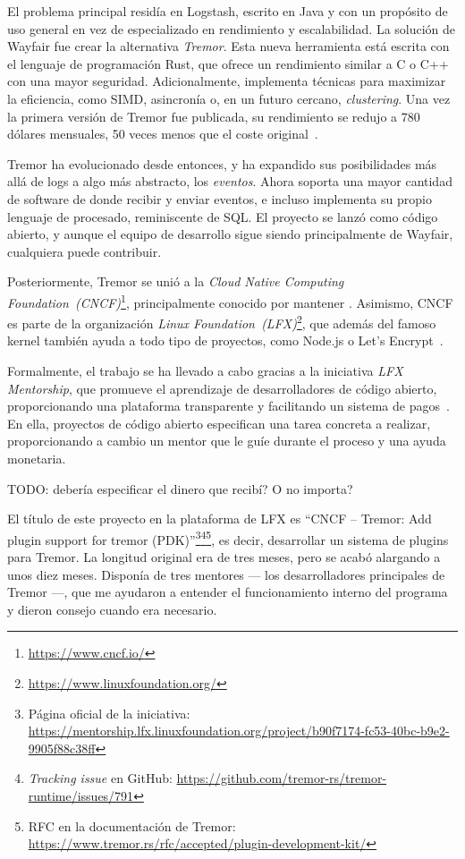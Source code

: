 El problema principal residía en Logstash, escrito en Java y con un propósito de
uso general en vez de especializado en rendimiento y escalabilidad. La solución
de Wayfair fue crear la alternativa \emph{Tremor}. Esta nueva herramienta está
escrita con el lenguaje de programación Rust, que ofrece un rendimiento similar
a C o C++ con una mayor seguridad. Adicionalmente, implementa técnicas para
maximizar la eficiencia, como SIMD, asincronía o, en un futuro cercano,
\emph{clustering}. Una vez la primera versión de Tremor fue publicada, su
rendimiento se redujo a 780 dólares mensuales, 50 veces menos que el coste
original~\cite{tremorcon_lll}.

Tremor ha evolucionado desde entonces, y ha expandido sus posibilidades más allá
de logs a algo más abstracto, los \emph{eventos}. Ahora soporta una mayor
cantidad de software de donde recibir y enviar eventos, e incluso implementa su
propio lenguaje de procesado, reminiscente de SQL. El proyecto se lanzó como
código abierto, y aunque el equipo de desarrollo sigue siendo principalmente de
Wayfair, cualquiera puede contribuir.

Posteriormente, Tremor se unió a la \emph{Cloud Native Computing
Foundation~(CNCF)}\footnote{\url{https://www.cncf.io/}}, principalmente conocido
por mantener \textcite{k8s}. Asimismo, CNCF es parte de la organización
\emph{Linux Foundation~(LFX)}\footnote{\url{https://www.linuxfoundation.org/}},
que además del famoso kernel también ayuda a todo tipo de proyectos, como
Node.js o Let's Encrypt~\cite{lfx_projects}.

Formalmente, el trabajo se ha llevado a cabo gracias a la iniciativa \emph{LFX
Mentorship}, que promueve el aprendizaje de desarrolladores de código abierto,
proporcionando una plataforma transparente y facilitando un sistema de
pagos~\cite{lfx_mentorship}. En ella, proyectos de código abierto especifican
una tarea concreta a realizar, proporcionando a cambio un mentor que le guíe
durante el proceso y una ayuda monetaria.

TODO: debería especificar el dinero que recibí? O no importa?

El título de este proyecto en la plataforma de LFX es ``CNCF -- Tremor: Add
plugin support for tremor (PDK)''\footnote{Página oficial de la iniciativa:
\url{https://mentorship.lfx.linuxfoundation.org/project/b90f7174-fc53-40bc-b9e2-9905f88c38ff}}\footnote{\emph{Tracking
issue} en GitHub:
\url{https://github.com/tremor-rs/tremor-runtime/issues/791}}\footnote{RFC en la
documentación de Tremor:
\url{https://www.tremor.rs/rfc/accepted/plugin-development-kit/}}, es decir,
desarrollar un sistema de plugins para Tremor. La longitud original era de tres
meses, pero se acabó alargando a unos diez meses. Disponía de tres mentores ---
los desarrolladores principales de Tremor ---, que me ayudaron a entender el
funcionamiento interno del programa y dieron consejo cuando era necesario.

